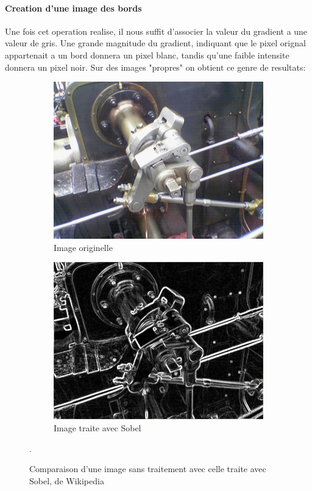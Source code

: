 \documentclass[a4paper, 12pt, titlepage, oneside]{article}
\begin{document}
	\paragraph{\textbf{Creation d'une image des bords}}
	Une fois cet operation realise, il nous suffit d'associer la valeur du gradient a une valeur de gris. Une grande magnitude du gradient, indiquant que le pixel orignal appartenait a un bord donnera un pixel blanc, tandis qu'une faible intensite donnera un pixel noir.
	Sur des images "propres" on obtient ce genre de resultats: \\
	\begin{figure}[!h]
		\centering
		\begin{subfigure}[b]{0.4\linewidth}
			\includegraphics[width=\linewidth]{ValveOriginal.png}
			\caption{Image originelle}
		\end{subfigure}
		\begin{subfigure}[b]{0.4\linewidth}
			\includegraphics[width=\linewidth]{ValveSobel.png}
			\caption{Image traite avec Sobel}
		\end{subfigure}
		\caption{Comparaison d'une image sans traitement avec celle traite avec Sobel, de Wikipedia \cite{WikiCannyOriginal}\cite{WikiSobel}}. 
		\label{fig:SobelGood}
	\end{figure}
\end{document}
